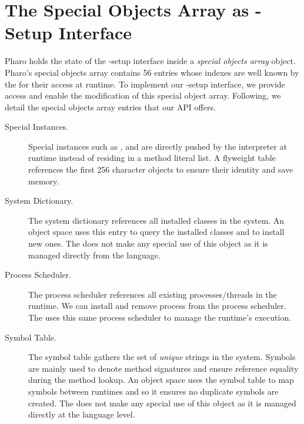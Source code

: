 \section{The Special Objects Array as \VM-Setup Interface}\label{sec:setup_interface}

Pharo \VM holds the state of the \VM-setup interface inside a \emph{special objects array} object. Pharo's special objects array contains 56 entries whose indexes are well known by the \VM for their access at runtime. To implement our \VM-setup interface, we provide access and enable the modification of this special object array. Following, we detail the special objects array entries that our API offers.

\begin{description}
\item[Special Instances.] Special instances such as ,  and  are directly pushed by the \VM interpreter at runtime instead of residing in a method literal list. A flyweight  table references the first 256 character objects to ensure their identity and save memory.

\item[System Dictionary.] The system dictionary references all installed classes in the system. An object space uses this entry to query the installed classes and to install new ones. The \VM does not make any special use of this object as it is managed directly from the language.

\item[Process Scheduler.] The process scheduler references all existing processes/threads in the runtime. We can install and remove process from the process scheduler. The \VM uses this same process scheduler to manage the runtime's execution.

\item[Symbol Table.] The symbol table gathers the set of \emph{unique} strings in the system. Symbols are mainly used to denote method signatures and ensure reference equality during the method lookup. An object space uses the symbol table to map symbols between runtimes and so it ensures no duplicate symbols are created. The \VM does not make any special use of this object as it is managed directly at the language level.


\end{description}
